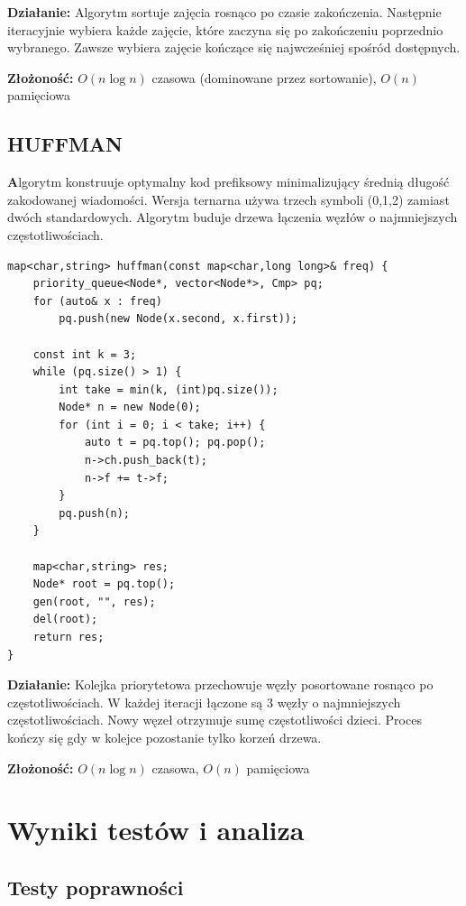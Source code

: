 \documentclass[11pt,a4paper]{article}
\begin{document}
\textbf{Działanie:} Algorytm sortuje zajęcia rosnąco po czasie zakończenia. Następnie iteracyjnie wybiera każde zajęcie, które zaczyna się po zakończeniu poprzednio wybranego. Zawsze wybiera zajęcie kończące się najwcześniej spośród dostępnych.

\textbf{Złożoność:} $O(n \log n)$ czasowa (dominowane przez sortowanie), $O(n)$ pamięciowa

\subsection{HUFFMAN}
\textbf Algorytm konstruuje optymalny kod prefiksowy minimalizujący średnią długość zakodowanej wiadomości. Wersja ternarna używa trzech symboli (0,1,2) zamiast dwóch standardowych. Algorytm buduje drzewa łączenia węzłów o najmniejszych częstotliwościach.

\begin{lstlisting}[caption={HUFFMAN – wersja ternarna}]
map<char,string> huffman(const map<char,long long>& freq) {
    priority_queue<Node*, vector<Node*>, Cmp> pq;
    for (auto& x : freq)
        pq.push(new Node(x.second, x.first));

    const int k = 3;
    while (pq.size() > 1) {
        int take = min(k, (int)pq.size());
        Node* n = new Node(0);
        for (int i = 0; i < take; i++) {
            auto t = pq.top(); pq.pop();
            n->ch.push_back(t);
            n->f += t->f;
        }
        pq.push(n);
    }

    map<char,string> res;
    Node* root = pq.top();
    gen(root, "", res);
    del(root);
    return res;
}
\end{lstlisting}

\textbf{Działanie:} Kolejka priorytetowa przechowuje węzły posortowane rosnąco po częstotliwościach. W każdej iteracji łączone są 3 węzły o najmniejszych częstotliwościach. Nowy węzeł otrzymuje sumę częstotliwości dzieci. Proces kończy się gdy w kolejce pozostanie tylko korzeń drzewa.

\textbf{Złożoność:} $O(n \log n)$ czasowa, $O(n)$ pamięciowa


\section{Wyniki testów i analiza}

\subsection{Testy poprawności}
\end{document}
